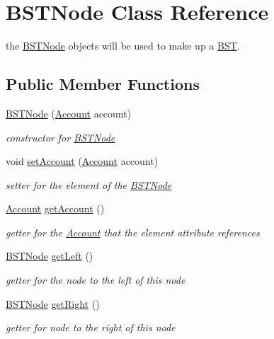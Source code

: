 \hypertarget{class_b_s_t_node}{}\section{B\+S\+T\+Node Class Reference}
\label{class_b_s_t_node}


the \hyperlink{class_b_s_t_node}{B\+S\+T\+Node} objects will be used to make up a \hyperlink{class_b_s_t}{B\+ST}.  


\subsection*{Public Member Functions}
\begin{DoxyCompactItemize}
\item 
\hyperlink{class_b_s_t_node_aaa051f6a85f1cbc75800579027bce3cf}{B\+S\+T\+Node} (\hyperlink{class_account}{Account} account)
\begin{DoxyCompactList}\small\item\em constructor for \hyperlink{class_b_s_t_node}{B\+S\+T\+Node} \end{DoxyCompactList}\item 
void \hyperlink{class_b_s_t_node_a1e2bfb150abc14665b512b10854b4dd4}{set\+Account} (\hyperlink{class_account}{Account} account)
\begin{DoxyCompactList}\small\item\em setter for the element of the \hyperlink{class_b_s_t_node}{B\+S\+T\+Node} \end{DoxyCompactList}\item 
\hyperlink{class_account}{Account} \hyperlink{class_b_s_t_node_a182e6ee7245ac0f1f2911fd0118625e5}{get\+Account} ()
\begin{DoxyCompactList}\small\item\em getter for the \hyperlink{class_account}{Account} that the element attribute references \end{DoxyCompactList}\item 
\hyperlink{class_b_s_t_node}{B\+S\+T\+Node} \hyperlink{class_b_s_t_node_aa54083ff3ae616311f577131f4b66e64}{get\+Left} ()
\begin{DoxyCompactList}\small\item\em getter for the node to the left of this node \end{DoxyCompactList}\item 
\hyperlink{class_b_s_t_node}{B\+S\+T\+Node} \hyperlink{class_b_s_t_node_a986cf72ed573103cf1f27234970eda98}{get\+Right} ()
\begin{DoxyCompactList}\small\item\em getter for node to the right of this node \end{DoxyCompactList}\item 

\end{DoxyCompactItemize}
